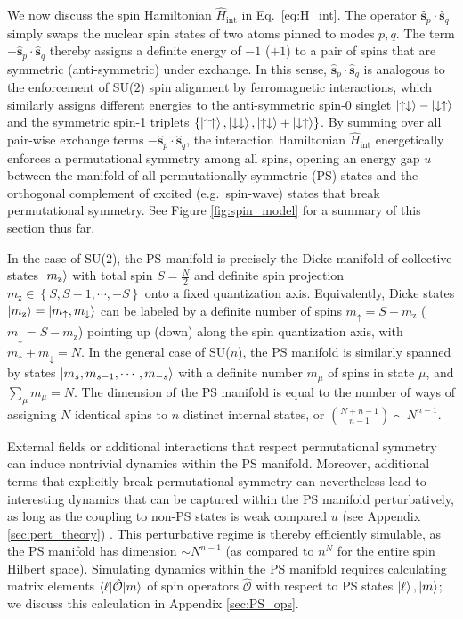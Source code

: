 \documentclass[aps,pra,nofootinbib,twocolumn,superscriptaddress]{revtex4-2}
\renewcommand{\t}{\text} %
\renewcommand{\set}[1]{\left\{#1\right\}} %
\newcommand{\bk}{\braket} %
\renewcommand{\v}{\bm} %
\newcommand{\1}{\mathds{1}}
\newcommand{\s}{\hat s}
\renewcommand{\H}{\hat H}
\renewcommand{\O}{\hat{\mathcal{O}}}
\newcommand{\up}{\uparrow}
\newcommand{\dn}{\downarrow}
\newcommand{\z}{\text{z}}
\begin{document}
We now discuss the spin Hamiltonian $\H_{\t{int}}$ in Eq.~\eqref{eq:H_int}.
The operator $\v\s_p\cdot\v\s_q$ simply swaps the nuclear spin states of two atoms pinned to modes $p,q$.
The term $-\v\s_p\cdot\v\s_q$ thereby assigns a definite energy of $-1$ ($+1$) to a pair of spins that are symmetric (anti-symmetric) under exchange.
In this sense, $\v\s_p\cdot\v\s_q$ is analogous to the enforcement of SU($2$) spin alignment by ferromagnetic interactions, which similarly assigns different energies to the anti-symmetric spin-0 singlet $\ket{\up\dn}-\ket{\dn\up}$ and the symmetric spin-1 triplets $\set{\ket{\up\up},\ket{\dn\dn},\ket{\up\dn}+\ket{\dn\up}}$.
By summing over all pair-wise exchange terms $-\v\s_p\cdot\v\s_q$, the interaction Hamiltonian $\H_{\t{int}}$ energetically enforces a permutational symmetry among all spins, opening an energy gap $u$ between the manifold of all permutationally symmetric (PS) states and the orthogonal complement of excited (e.g.~spin-wave) states that break permutational symmetry.
See Figure \ref{fig:spin_model} for a summary of this section thus far.

In the case of SU($2$), the PS manifold is precisely the Dicke manifold of collective states $\ket{m_\z}$ with total spin $S=\frac{N}{2}$ and definite spin projection $m_\z\in\set{S,S-1,\cdots,-S}$ onto a fixed quantization axis.
Equivalently, Dicke states $\ket{m_\z}=\ket{m_\up,m_\dn}$ can be labeled by a definite number of spins $m_\up=S+m_\z$ ($m_\dn=S-m_\z$) pointing up (down) along the spin quantization axis, with $m_\up+m_\dn=N$.
In the general case of SU($n$), the PS manifold is similarly spanned by states $\ket{m_s,m_{s-1},\cdots,m_{-s}}$ with a definite number $m_\mu$ of spins in state $\mu$, and $\sum_\mu m_\mu=N$.
The dimension of the PS manifold is equal to the number of ways of assigning $N$ identical spins to $n$ distinct internal states, or ${N+n-1 \choose n-1} \sim N^{n-1}$.

External fields or additional interactions that respect permutational symmetry can induce nontrivial dynamics within the PS manifold.
Moreover, additional terms that explicitly break permutational symmetry can nevertheless lead to interesting dynamics that can be captured within the PS manifold perturbatively, as long as the coupling to non-PS states is weak compared $u$ (see Appendix \ref{sec:pert_theory}) \cite{bravyi2011schrieffer}.
This perturbative regime is thereby efficiently simulable, as the PS manifold has dimension $\sim N^{n-1}$ (as compared to $n^N$ for the entire spin Hilbert space).
Simulating dynamics within the PS manifold requires calculating matrix elements $\bk{\ell|\O|m}$ of spin operators $\O$ with respect to PS states $\ket\ell,\ket{m}$; we discuss this calculation in Appendix \ref{sec:PS_ops}.
\end{document}
